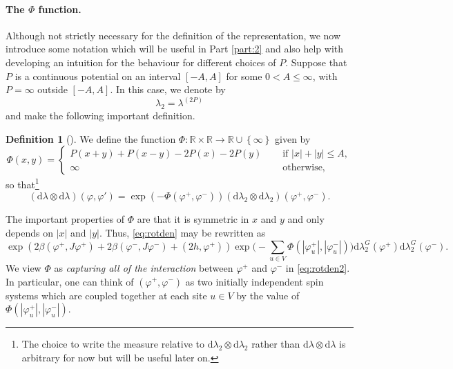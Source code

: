 \documentclass{article}
\numberwithin{equation}{section}
\theoremstyle{definition}
\theoremstyle{definition}
\newtheorem{definition}{Definition}
\theoremstyle{remark}
\renewcommand{\d}{\mathrm{d}}
\newcommand\vp{\varphi}
\newcommand\R{\mathbb{R}}
\renewcommand{\d}{\mathrm{d}}
\renewcommand{\l}{\lambda}
\newcommand{\vpp}{\vp^+}
\newcommand{\vpm}{\vp^-}
\newcommand{\I}{\Phi}
\begin{document}
\paragraph{The $\I$ function. }
Although not strictly necessary for the definition of the representation, we now introduce some notation which will be useful in Part \ref{part:2} and also help with developing an intuition for the behaviour for different choices of $P$.
Suppose that $P$ is a continuous potential on an interval $\left[ -A,A \right]$ for some $0 < A \leq \infty$, with $P = \infty$ outside $\left[ -A,A \right]$. In this case, we denote by
\[
	\l_2 = \l^{(2P)}
\] 
and make the following important definition.	
\begin{definition}[]
	We define the function $\I : \R \times \R \to \R \cup \left\{ \infty \right\} $ given by 
\begin{equation}\label{eq:Idef}
	\I(x,y) = 
\begin{cases}
	P(x+y) + P(x-y) - 2 P(x) -  2 P(y) \quad & \text{ if } |x| + |y| \leq A,\\ 
	\infty \quad & \text{ otherwise,}
\end{cases}
\end{equation} 
so that{\hypersetup{linkcolor=black}\footnote{The choice to write the measure relative to $\d\l_2 \otimes \d\l_2$ rather than $\d\l \otimes \d\l$ is arbitrary for now but will be useful later on.}}
\[
	(\d\l \otimes \d\l)(\vp,\vp') = \exp( -\I(\vpp,\vpm)) (\d\l_2 \otimes \d\l_2)(\vpp,\vpm).
\]
\end{definition}
\noindent The important properties of $\I$ are that it is symmetric in $x$ and $y$ and only depends on $|x|$ and $|y|$. Thus, \eqref{eq:rotden} may be rewritten as 
\begin{equation}\label{eq:rotden2}
	\exp( 2\beta (\vpp,J\vpp) + 2\beta (\vpm,J\vpm) + (2h,\vpp)) \exp\big( -\textstyle\sum_{u \in V} \I(|\vpp_u|,|\vpm_u|)\big) \d\l_2^G(\vpp) \d\l_2^G(\vpm).
\end{equation}
We view $\I$ as \emph{capturing all of the interaction} between $\vpp$ and $\vpm$ in \eqref{eq:rotden2}.
In particular, one can think of $(\vpp,\vpm)$ as two initially independent spin systems which are coupled together at each site $u \in V$ by the value of $\I(|\vpp_u|,|\vpm_u|)$. 
\end{document}
